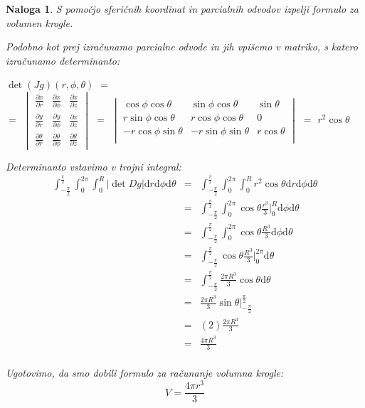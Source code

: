 \documentclass[12pt, a4paper]{article}
\newtheorem{naloga}{Naloga}
\begin{document}
\begin{naloga}
S pomočjo sferičnih koordinat in parcialnih odvodov izpelji formulo za volumen krogle.

\emph{Podobno kot prej izračunamo parcialne odvode in jih vpišemo v matriko, s katero izračunamo determinanto:}
\\
\begin{center}
$ \det (Jg)(r,\phi, \theta)$ $=$  \\ $=$ \large  $\begin{vmatrix} \frac{\partial x}{\partial r}  &  \frac{\partial x}{\partial \phi} &  \frac{\partial x}{\partial z} \\  \frac{\partial y}{\partial r}  &  \frac{\partial y}{\partial \phi} &  \frac{\partial x}{\partial z} \\ \frac{\partial \theta}{\partial r}  &  \frac{\partial \theta}{\partial \phi} &  \frac{\partial \theta}{\partial z} \end{vmatrix} $ 
$=$  \normalsize $ \begin{vmatrix} \cos \phi  \cos \theta & \sin \phi  \cos \theta & \sin \theta \\ r \sin \phi  \cos \theta  & r \cos \phi  \cos \theta  & 0 \\ -r \cos \phi  \sin \theta  & -r \sin \phi  \sin \theta  & r \cos \theta \\ \end{vmatrix} $  $=$ $r^2 \cos \theta $
\end{center}

\emph{Determinanto vstavimo v trojni integral:} \\

\begin{eqnarray*}
\int^{\frac {\pi}{2}}_{- \frac {\pi}{2}} \int^{2\pi}_{0} \int^{R}_{0}  \big | \det Dg \big | \mathrm{d} r \mathrm{d}\phi \mathrm{d}\theta  &=&  \int^{\frac {\pi}{2}}_{- \frac {\pi}{2}} \int^{2\pi}_{0} \int^{R}_{0}   r^2 \cos \theta   \mathrm{d} r \mathrm{d}\phi \mathrm{d}\theta  \\
 &=&  \int^{\frac {\pi}{2}}_{- \frac {\pi}{2}} \int^{2\pi}_{0} \cos \theta \frac {r^3}{3} \big |^{R}_{0} \mathrm{d}\phi \mathrm{d}\theta  \\
 &=&  \int^{\frac {\pi}{2}}_{- \frac {\pi}{2}} \int^{2\pi}_{0} \cos \theta \frac {R^3}{3} \mathrm{d}\phi \mathrm{d}\theta  \\
 &=&  \int^{\frac {\pi}{2}}_{- \frac {\pi}{2}} \cos \theta \frac {R^3}{3} \big |^{2 \pi}_{0} \mathrm{d} \theta  \\
 &=&  \int^{\frac {\pi}{2}}_{- \frac {\pi}{2}} \frac {2 \pi R^3}{3} \cos \theta \mathrm{d} \theta  \\
 &=&  \frac {2 \pi R^3}{3} \sin \theta \big |^{\frac {\pi}{2}}_{-\frac {\pi}{2}}  \\
 &=&  (2) \frac {2 \pi R^3}{3}  \\
 &=&  \frac {4 \pi R^3}{3}  \\
\end{eqnarray*}

\emph
{Ugotovimo, da smo dobili formulo za računanje volumna krogle:}
$$
V=\frac{4\pi r^3}{3}
$$
\end{naloga}
\end{document}
